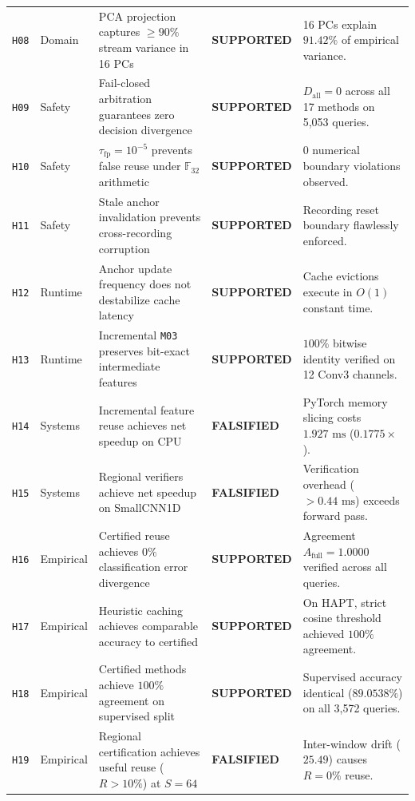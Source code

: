 \documentclass[journal,onecolumn,10pt]{IEEEtran}
\newcommand{\F}{\mathbb{F}}
\newcommand{\code}[1]{{\small\ttfamily\nolinkurl{#1}}}
\theoremstyle{remark}
\begin{document}
\begin{table}[!htbp]
{\begin{tabular}{@{}llP{5.2cm}lP{4.2cm}@{}}
\code{H08} & Domain & PCA projection captures $\ge 90\%$ stream variance in 16 PCs & \textcolor{okgreen}{\textbf{SUPPORTED}} & 16 PCs explain $91.42\%$ of empirical variance. \\
\code{H09} & Safety & Fail-closed arbitration guarantees zero decision divergence & \textcolor{okgreen}{\textbf{SUPPORTED}} & $D_{\text{all}} = 0$ across all 17 methods on 5,053 queries. \\
\code{H10} & Safety & $\tau_{\text{fp}} = 10^{-5}$ prevents false reuse under $\F_{32}$ arithmetic & \textcolor{okgreen}{\textbf{SUPPORTED}} & 0 numerical boundary violations observed. \\
\code{H11} & Safety & Stale anchor invalidation prevents cross-recording corruption & \textcolor{okgreen}{\textbf{SUPPORTED}} & Recording reset boundary flawlessly enforced. \\
\code{H12} & Runtime & Anchor update frequency does not destabilize cache latency & \textcolor{okgreen}{\textbf{SUPPORTED}} & Cache evictions execute in $O(1)$ constant time. \\
\code{H13} & Runtime & Incremental \code{M03} preserves bit-exact intermediate features & \textcolor{okgreen}{\textbf{SUPPORTED}} & $100\%$ bitwise identity verified on 12 Conv3 channels. \\
\code{H14} & Systems & Incremental feature reuse achieves net speedup on CPU & \textcolor{warnred}{\textbf{FALSIFIED}} & PyTorch memory slicing costs $1.927\text{ ms}$ ($0.1775\times$). \\
\code{H15} & Systems & Regional verifiers achieve net speedup on SmallCNN1D & \textcolor{warnred}{\textbf{FALSIFIED}} & Verification overhead ($>0.44\text{ ms}$) exceeds forward pass. \\
\code{H16} & Empirical & Certified reuse achieves $0\%$ classification error divergence & \textcolor{okgreen}{\textbf{SUPPORTED}} & Agreement $A_{\text{full}} = 1.0000$ verified across all queries. \\
\code{H17} & Empirical & Heuristic caching achieves comparable accuracy to certified & \textcolor{okgreen}{\textbf{SUPPORTED}} & On HAPT, strict cosine threshold achieved $100\%$ agreement. \\
\code{H18} & Empirical & Certified methods achieve $100\%$ agreement on supervised split & \textcolor{okgreen}{\textbf{SUPPORTED}} & Supervised accuracy identical ($89.0538\%$) on all 3,572 queries. \\
\code{H19} & Empirical & Regional certification achieves useful reuse ($R > 10\%$) at $S=64$ & \textcolor{warnred}{\textbf{FALSIFIED}} & Inter-window drift ($25.49$) causes $R = 0\%$ reuse. \\

\end{tabular}}
\end{table}
\end{document}
